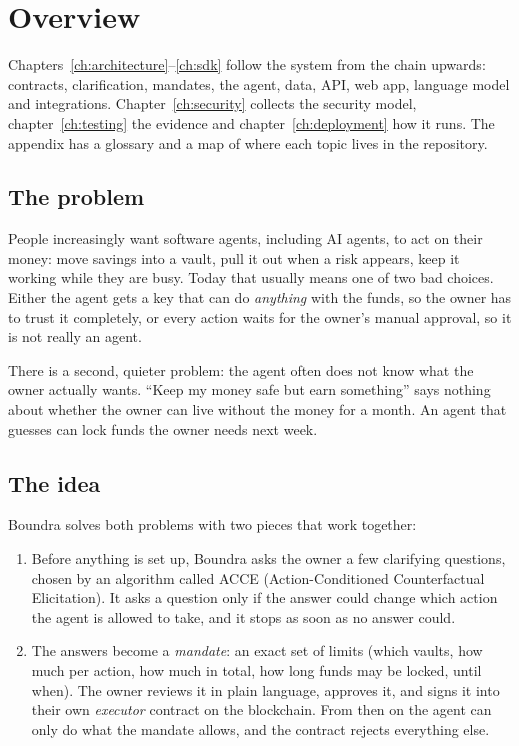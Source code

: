\chapter{Overview}

\begin{note}
Chapters~\ref{ch:architecture}--\ref{ch:sdk} follow the system from the chain upwards: contracts, clarification, mandates, the agent, data, API, web app, language model and integrations. Chapter~\ref{ch:security} collects the security model, chapter~\ref{ch:testing} the evidence and chapter~\ref{ch:deployment} how it runs. The appendix has a glossary and a map of where each topic lives in the repository.
\end{note}

\section{The problem}

People increasingly want software agents, including AI agents, to act on their money: move savings into a vault, pull it out when a risk appears, keep it working while they are busy. Today that usually means one of two bad choices. Either the agent gets a key that can do \emph{anything} with the funds, so the owner has to trust it completely, or every action waits for the owner's manual approval, so it is not really an agent.

There is a second, quieter problem: the agent often does not know what the owner actually wants. ``Keep my money safe but earn something'' says nothing about whether the owner can live without the money for a month. An agent that guesses can lock funds the owner needs next week.

\section{The idea}

Boundra solves both problems with two pieces that work together:

\begin{enumerate}
  \item {} Before anything is set up, Boundra asks the owner a few clarifying questions, chosen by an algorithm called ACCE (Action-Conditioned Counterfactual Elicitation). It asks a question only if the answer could change which action the agent is allowed to take, and it stops as soon as no answer could.
  \item {} The answers become a \emph{mandate}: an exact set of limits (which vaults, how much per action, how much in total, how long funds may be locked, until when). The owner reviews it in plain language, approves it, and signs it into their own \emph{executor} contract on the blockchain. From then on the agent can only do what the mandate allows, and the contract rejects everything else.
\end{enumerate}


